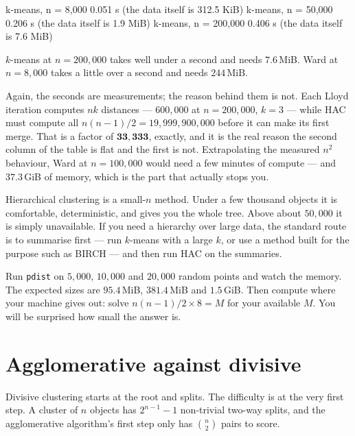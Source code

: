 \documentclass[11pt]{article}
\begin{document}
\begin{codeout}
  k-means, n = 8,000     0.051 s   (the data itself is 312.5 KiB)
  k-means, n = 50,000    0.206 s   (the data itself is 1.9 MiB)
  k-means, n = 200,000   0.406 s   (the data itself is 7.6 MiB)
\end{codeout}

$k$-means at $n = 200{,}000$ takes well under a second and needs $7.6$\,MiB.
Ward at $n = 8{,}000$ takes a little over a second and needs $244$\,MiB.

Again, the seconds are measurements; the reason behind them is not. Each Lloyd
iteration computes $nk$ distances --- $600{,}000$ at $n = 200{,}000$, $k = 3$
--- while HAC must compute all $n(n-1)/2 = 19{,}999{,}900{,}000$ before it can
make its first merge. That is a factor of $\mathbf{33{,}333}$, exactly, and it
is the real reason the second column of the table is flat and the first is
not. Extrapolating the measured $n^2$ behaviour, Ward at $n = 100{,}000$ would
need a few minutes of compute --- and $37.3$\,GiB of memory, which is the part
that actually stops you.

\begin{keyidea}
Hierarchical clustering is a small-$n$ method. Under a few thousand objects it
is comfortable, deterministic, and gives you the whole tree. Above about
$50{,}000$ it is simply unavailable. If you need a hierarchy over large data,
the standard route is to summarise first --- run $k$-means with a large $k$,
or use a method built for the purpose such as BIRCH --- and then run HAC on
the summaries.
\end{keyidea}

\begin{tryit}
Run \texttt{pdist} on $5{,}000$, $10{,}000$ and $20{,}000$ random points and
watch the memory. The expected sizes are $95.4$\,MiB, $381.4$\,MiB and
$1.5$\,GiB. Then compute where your machine gives out: solve
$n(n-1)/2 \times 8 = M$ for your available $M$. You will be surprised how
small the answer is.
\end{tryit}

\section{Agglomerative against divisive}
\label{sec:div}

Divisive clustering starts at the root and splits. The difficulty is at the
very first step. A cluster of $n$ objects has $2^{n-1} - 1$ non-trivial
two-way splits, and the agglomerative algorithm's first step only has
$\binom{n}{2}$ pairs to score.
\end{document}

